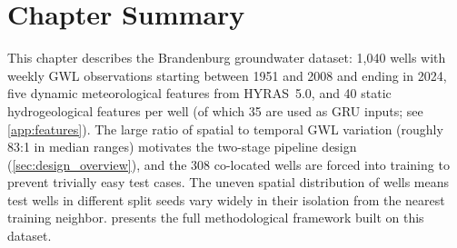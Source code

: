\section{Chapter Summary}

This chapter describes the Brandenburg groundwater dataset: 1{,}040 wells with weekly GWL observations starting between 1951 and 2008 and ending in 2024, five dynamic meteorological features from HYRAS~5.0, and 40 static hydrogeological features per well (of which 35 are used as GRU inputs; see \cref{app:features}). The large ratio of spatial to temporal GWL variation (roughly 83:1 in median ranges) motivates the two-stage pipeline design (\cref{sec:design_overview}), and the 308 co-located wells are forced into training to prevent trivially easy test cases. The uneven spatial distribution of wells means test wells in different split seeds vary widely in their isolation from the nearest training neighbor.  presents the full methodological framework built on this dataset.